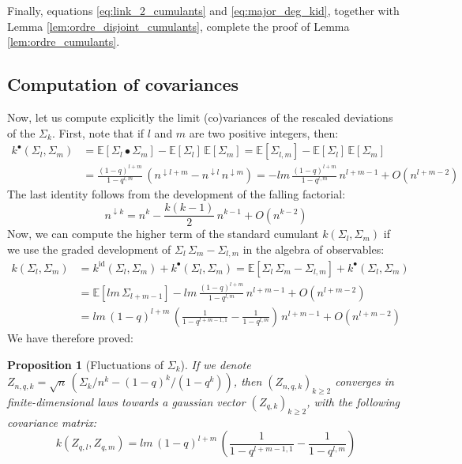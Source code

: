 \documentclass[10pt]{amsart}
\newtheorem{proposition}[theorem]{Proposition}
\theoremstyle{remark}
\newcommand{\esper}{\mathbb{E}}
\begin{document}
Finally, equations \eqref{eq:link_2_cumulants} and \eqref{eq:major_deg_kid}, together with Lemma \ref{lem:ordre_disjoint_cumulants}, complete the proof of Lemma \ref{lem:ordre_cumulants}.
\bigskip



\subsection{Computation of covariances} Now, let us compute explicitly the limit (co)variances of the rescaled deviations of the $\varSigma_k$. First, note that if $l$ and $m$ are two positive integers, then:
\begin{align*}
k^\bullet(\varSigma_l,\varSigma_m)&=\esper[\varSigma_l \bullet \varSigma_m] - \esper[\varSigma_l]\,\esper[\varSigma_m] = \esper[\varSigma_{l,m}] - \esper[\varSigma_l]\,\esper[\varSigma_m]\\
&= \frac{(1-q)^{l+m}}{1-q^{l,m}}\,\left(n^{\downarrow l+m} - n^{\downarrow l}\,n^{\downarrow m}\right)=-lm\,\frac{(1-q)^{l+m}}{1-q^{l,m}}\,n^{l+m-1}+ O(n^{l+m-2})\end{align*}
The last identity follows from the development of the falling factorial:
$$n^{\downarrow k} =n^k- \frac{k(k-1)}{2}\,n^{k-1}+O(n^{k-2})$$
Now, we can compute the higher term of the standard cumulant $k(\varSigma_l,\varSigma_m)$ if we use the graded development of $\varSigma_l\,\varSigma_m-\varSigma_{l,m}$ in the algebra of observables:
\begin{align*}k(\varSigma_l,\varSigma_m)&=k^{\mathrm{id}}(\varSigma_l,\varSigma_m)+k^\bullet(\varSigma_l,\varSigma_m)=\esper[\varSigma_{l}\,\varSigma_{m}-\varSigma_{l,m}]+k^\bullet(\varSigma_l,\varSigma_m)\\
&=\esper[lm\,\varSigma_{l+m-1}]-lm\,\frac{(1-q)^{l+m}}{1-q^{l,m}}\,n^{l+m-1}+ O(n^{l+m-2})\\
&=lm\,(1-q)^{l+m}\,\left(\frac{1}{1-q^{l+m-1,1}} - \frac{1}{1-q^{l,m}}\right)\,n^{l+m-1}+ O(n^{l+m-2})
\end{align*}
We have therefore proved:
\begin{proposition}[Fluctuations of $\varSigma_k$]\label{PropFluctuationsCharacters}
If we denote $Z_{n,q,k}=\sqrt{n}\,(\varSigma_k/n^k - (1-q)^k/(1-q^k))$, then $(Z_{n,q,k})_{k \geq 2}$ converges in finite-dimensional laws towards a gaussian vector $(Z_{q,k})_{k \geq 2}$, with the following covariance matrix:
$$k(Z_{q,l},Z_{q,m})=lm\,(1-q)^{l+m}\,\left(\frac{1}{1-q^{l+m-1,1}} - \frac{1}{1-q^{l,m}}\right)$$
\end{proposition}
\end{document}
